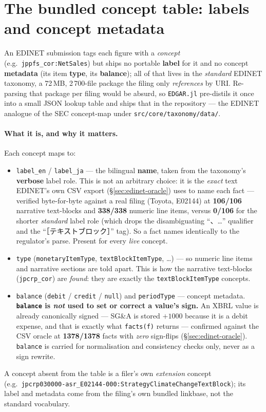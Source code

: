\documentclass[11pt,a4paper]{report}
\newcommand{\jpcjk}[2]{{\cjkJPfont #1}}
\begin{document}
\section{The bundled concept table: labels and concept metadata}\label{sec:edinet-concepts}

An EDINET submission tags each figure with a \emph{concept} (e.g.\ \texttt{jppfs\_cor:NetSales}) but ships
no portable \textbf{label} for it and no concept \textbf{metadata} (its item \textbf{type}, its
\textbf{balance}); all of that lives in the \emph{standard} EDINET taxonomy, a 72\,MB, 2\,700-file package
the filing only \emph{references} by URI. Re-parsing that package per filing would be absurd, so
\texttt{EDGAR.jl} pre-distils it once into a small JSON lookup table and ships that in the repository ---
the EDINET analogue of the SEC concept-map under \texttt{src/core/taxonomy/data/}.

\paragraph{What it is, and why it matters.} Each concept maps to:
\begin{itemize}[nosep]
  \item \texttt{label\_en} / \texttt{label\_ja} --- the bilingual \textbf{name}, taken from the taxonomy's
    \textbf{verbose} label role. This is not an arbitrary choice: it is the \emph{exact} text EDINET's own
    CSV export (\S\ref{sec:edinet-oracle}) uses to name each fact --- verified byte-for-byte against a real
    filing (Toyota, E02144) at \textbf{106/106} narrative text-blocks and \textbf{338/338} numeric line
    items, versus \textbf{0/106} for the shorter \emph{standard} label role (which drops the disambiguating
    ``\jpcjk{、…}{}'' qualifier and the ``\jpcjk{［テキストブロック］}{}'' tag). So a fact names identically
    to the regulator's parse. Present for every \emph{live} concept.
  \item \texttt{type} (\texttt{monetaryItemType}, \texttt{textBlockItemType}, \ldots) --- so numeric line
    items and narrative sections are told apart. This is how the narrative text-blocks (\texttt{jpcrp\_cor})
    are \emph{found}: they are exactly the \texttt{textBlockItemType} concepts.
  \item \texttt{balance} (\texttt{debit} / \texttt{credit} / \texttt{null}) and \texttt{periodType} ---
    concept metadata. \textbf{\texttt{balance} is \emph{not} used to set or correct a value's sign.} An XBRL
    value is already canonically signed --- SG\&A is stored \(+1000\) because it is a debit expense, and
    that is exactly what \texttt{facts(f)} returns --- confirmed against the CSV oracle at \textbf{1378/1378}
    facts with \emph{zero} sign-flips (\S\ref{sec:edinet-oracle}). \texttt{balance} is carried for
    normalisation and consistency checks only, never as a sign rewrite.
\end{itemize}
A concept absent from the table is a filer's own \emph{extension} concept (e.g.\
\texttt{jpcrp030000-asr\_E02144-000:StrategyClimateChangeTextBlock}); its label and metadata come from the
filing's own bundled linkbase, not the standard vocabulary.
\end{document}

